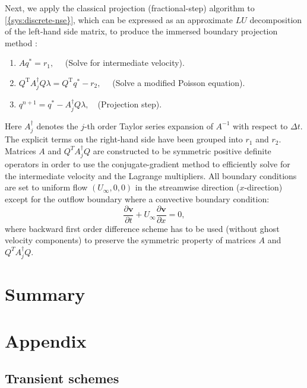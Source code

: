 \documentclass{article}
\numberwithin{equation}{section}
\begin{document}
Next, we apply the classical projection (fractional-step) algorithm to \cref{{sys:discrete-nse}}, which can be expressed as an approximate $LU$ decomposition of the left-hand side matrix, to produce the immersed boundary projection method \cite{Colonius:2008}:
\begin{enumerate}
	\item $A q^*=r_1, \quad$ (Solve for intermediate velocity).
	\item $Q^{\mathrm{T}} A_j^{\dagger} Q \lambda=Q^{\mathrm{T}} q^*-r_2, \quad$ (Solve a modified Poisson equation).
	\item $q^{n+1}=q^*-A_j^{\dagger} Q \lambda, \quad$(Projection step).
\end{enumerate}
Here $A^{\dagger}_{j}$ denotes the $j$-th order Taylor series expansion of $A^{-1}$ with respect to $\Delta t$. The explicit terms on the right-hand side have been grouped into $r_1$ and $r_2$. Matrices $A$ and $Q^TA^\dagger_jQ$ are constructed to be symmetric positive definite operators in order to use the conjugate-gradient method to efficiently solve for the intermediate velocity and the Lagrange multipliers. All boundary conditions are set to uniform flow $(U_{\infty}, 0, 0)$ in the streamwise direction ($x$-direction) except for the outflow boundary where a convective boundary condition:
\begin{equation}
  \frac{\partial\boldsymbol{v}}{\partial t} + U_\infty \frac{\partial \boldsymbol{v}}{\partial x}=0,
\end{equation}
where backward first order difference scheme has to be used (without ghost velocity components) to preserve the symmetric property of matrices $A$ and $Q^TA^\dagger_jQ$.



	
\section{Summary}\label{sec:summary}
	

\pagebreak


 

\pagebreak
\appendix
\section{Appendix}

\subsection{Transient schemes}
\end{document}
